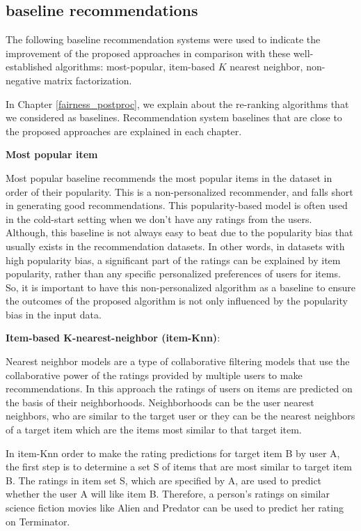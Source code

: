     \subsection{baseline recommendations}
    
        The following baseline recommendation systems were used to indicate the improvement of the proposed approaches in comparison with these well-established algorithms: most-popular, item-based $K$ nearest neighbor, non-negative matrix factorization. 
        
        In Chapter \ref{fairness_postproc}, we explain about the re-ranking algorithms that we considered as baselines. Recommendation system baselines that are close to the proposed approaches are explained in each chapter.
        
        
        \textbf{Most popular item}
        
        Most popular baseline recommends the most popular items in the dataset in order of their popularity. This is a non-personalized recommender, and falls short in generating good recommendations. This popularity-based model is often used in the cold-start setting when we don't have any ratings from the users. Although, this baseline is not always easy to beat due to the popularity bias that usually exists in the recommendation datasets. In other words, in datasets with high popularity bias, a significant part of the ratings can be explained by item popularity, rather than any specific personalized preferences of users for items. So, it is important to have this non-personalized algorithm as a baseline to ensure the outcomes of the proposed algorithm is not only influenced by the popularity bias in the input data.
        
        
        \textbf{Item-based K-nearest-neighbor (item-Knn)}: 
        
        Nearest neighbor models are a type of collaborative filtering models that use the collaborative power of the ratings provided by multiple users to make recommendations. In this approach the ratings of users on items are predicted on the basis of their neighborhoods. Neighborhoods can be the user nearest neighbors, who are similar to the target user or they can be the nearest neighbors of a target item which are the items most similar to that target item.
        
        In item-Knn order to make the rating predictions for target item B by user A, the first step is to determine a set S of items that are most similar to target item B. The ratings in item set S, which are specified by A, are used to predict whether the user A will like item B. Therefore, a person's ratings on similar science fiction movies like Alien and Predator can be used to predict her rating on Terminator.
    
